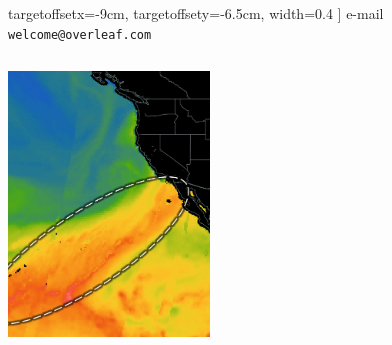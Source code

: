 \documentclass[20pt, a0paper, portrait]{tikzposter}
\begin{document}
        targetoffsetx=-9cm, 
        targetoffsety=-6.5cm, 
        width=0.4\linewidth
        ]
        {e-mail \texttt{welcome@overleaf.com}}
\begin{columns}
    {
        \begin{tikzfigure}
            \includegraphics[width=0.4\textwidth]{images/ar}
        \end{tikzfigure}
    }
\end{columns}
\end{document}
